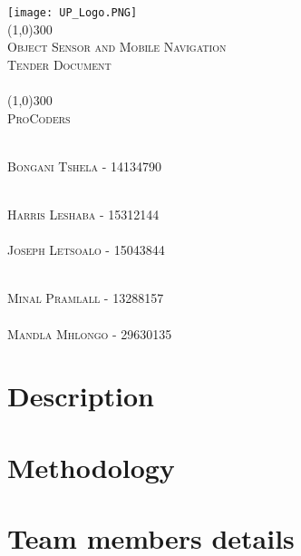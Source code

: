 \documentclass[runningheads,a4paper]{article}
\begin{document}
	
	\begin{titlepage}
		\begin{center}
			\texttt{[image: UP\_Logo.PNG]}  \\
			[1cm]
			\line(1,0){300} \\
			[0.3cm]
			\textsc{\Large
				Object Sensor and Mobile Navigation\\
				Tender Document\\
				\hfill
			}\\
			[0.1cm]
			\line(1,0){300} \\
			[0.7cm]
			\textsc{\Large
				ProCoders
			} \\
		\end{center}
		
		\begin{center}
			\begin{centre}
				\textsc{\large\\
					Bongani Tshela - 14134790\\ 
				}
			
    				\textsc{\large\\
    					Harris Leshaba - 15312144\\ 
    				}
				\textsc{\large\\
					Joseph Letsoalo - 15043844\\ 
				}
				
				\textsc{\large\\
					Minal Pramlall - 13288157\\ 
				}
				\textsc{\large\\
					Mandla Mhlongo - 29630135\\ 
				}
			\end{centre}
			
			
		\end{center}
	\end{titlepage}
	
	\begingroup
	
	\tableofcontents
	\endgroup
	\newpage
	
	\section{Description} %
  \section{Methodology} %
  \section{Team members details}%
  
\end{document}
